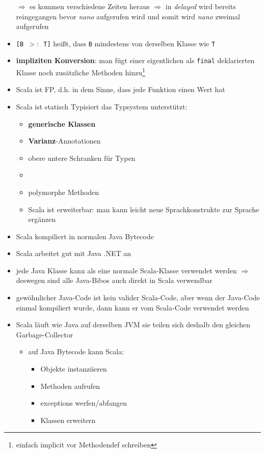 \begin{itemize}
  $\Rightarrow$ es kommen verschiedene Zeiten heraus $\Rightarrow$ in
  \textit{delayed} wird bereits reingegangen bevor \textit{nano} 
  aufgerufen wird und somit wird \textit{nano} zweimal aufgerufen
  \item \texttt{[B $>:$ T]} heißt, dass \texttt{B} mindestens von derselben
  Klasse wie \texttt{T}
  \item \textbf{impliziten Konversion}: man fügt einer eigentlichen als 
  \texttt{final} deklarierten Klasse noch
  zusätzliche Methoden hinzu\footnote{einfach implicit vor Methodendef
  schreiben}
  \item Scala ist FP, d.h. in dem Sinne, dass jede Funktion einen Wert hat
  \item Scala ist statisch Typisiert \und das Typsystem unterstützt:
  \begin{itemize}
    \item \textbf{generische Klassen}
    \item \textbf{Varianz}-Annotationen
    \item obere \und untere Schranken für Typen
    \item {}
    \item polymorphe Methoden
    \item Scala ist erweiterbar: man kann leicht neue Sprachkonstrukte
    zur Sprache ergänzen
  \end{itemize}
  \item Scala kompiliert in normalen Java Bytecode
  \item Scala arbeitet gut mit Java \und .NET an
  \item jede Java Klasse kann als eine normale Scala-Klasse verwendet werden
  $\Rightarrow$ deswegen sind alle Java-Bibos auch direkt in Scala verwendbar
  \item gewöhnlicher Java-Code ist kein valider Scala-Code, aber wenn der
  Java-Code einmal kompiliert wurde, dann kann er vom Scala-Code verwendet
  werden
  \item Scala läuft wie Java auf derselben JVM \und sie teilen sich deshalb
  den gleichen Garbage-Collector
  \begin{itemize}
    \item auf Java Bytecode kann Scala:
    \begin{itemize}
      \item Objekte instanziieren
      \item Methoden aufrufen
      \item exceptions werfen/abfangen
      \item Klassen erweitern

\end{itemize}
\end{itemize}
\end{itemize}
